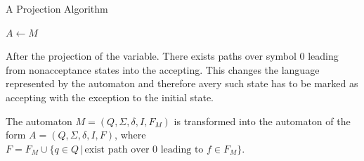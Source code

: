 \documentclass[pdflatex,sn-mathphys-num]{sn-jnl}%
\theoremstyle{thmstyleone}%
\theoremstyle{thmstyletwo}%
\theoremstyle{thmstylethree}%
\begin{document}
        \begin{algorithm}
            \caption{A Projection Algorithm}
            \small
            \DontPrintSemicolon

            \vspace*{0.5em}

            $A \leftarrow M$\;




        \end{algorithm}

        After the projection of the variable. There exists paths over symbol 0 leading from nonacceptance states into the accepting. This changes the language represented by the automaton and therefore avery such state has to be marked as accepting with the exception to the initial state.

        The automaton $M = (Q, \Sigma, \delta, I, F_M)$ is transformed into the automaton of the form $A = (Q, \Sigma, \delta, I, F)$, where $F = F_M \cup \{q \in Q\,|\, \text{exist path over 0 leading to } f \in F_M\}$.
\end{document}

